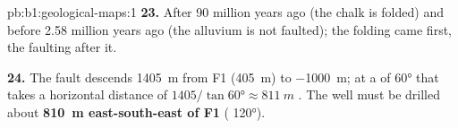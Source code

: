 \begin{solution}{pb:b1:geological-maps:1}
\textbf{23.} After 90 million years ago (the chalk is folded) and before
2.58 million years ago (the alluvium is not faulted); the folding came
first, the faulting after it.

\textbf{24.} The fault descends \qty{1405}{m} from F1 (\qty{405}{m}) to
\qty{-1000}{m}; at a  of \ang{60} that takes a horizontal distance of
$1405/\tan\ang{60} \approx \qty{811}{m}$ . The well must be drilled
about \textbf{\qty[text-series-to-math=true]{810}{m} east-south-east of F1} ( \ang{120}).
\end{solution}

